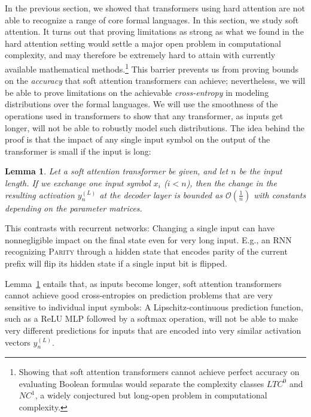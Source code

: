 \documentclass[11pt,a4paper]{article}
\newcounter{theorem}
\newtheorem{lemma}[theorem]{Lemma}
\begin{document}
In the previous section, we showed that transformers using hard attention are not able to recognize a range of core formal languages.
In this section, we study soft attention.
It turns out that proving limitations as strong as what we found in the hard attention setting would settle a major open problem in computational complexity, and  may therefore be extremely hard to attain with currently available mathematical methods.\footnote{Showing that soft attention transformers cannot achieve perfect accuracy on evaluating Boolean formulas would separate the complexity classes $LTC^0$ and $NC^1$, a widely conjectured but long-open problem in computational complexity.}
This barrier prevents us from proving bounds on the \emph{accuracy} that soft attention transformers can achieve; nevertheless, we will be able to prove limitations on the achievable \emph{cross-entropy} in modeling distributions over the formal languages.
We will use the smoothness of the operations used in transformers to show that any transformer, as inputs get longer, will not be able to robustly model such distributions.
The idea behind the proof is that the impact of any single input symbol on the output of the transformer is small if the input is long:
\begin{lemma}\label{lem:soft-tech}
Let a soft attention transformer be given, and let $n$ be the input length.
If we exchange one input symbol $x_i$ ($i < n$), %
then the change in the resulting activation $y_n^{(L)}$ at the decoder layer is bounded as $\mathcal{O}(\frac{1}{n})$ with constants depending on the parameter matrices. %
\end{lemma}
This contrasts with recurrent networks:
Changing a single input can have nonnegligible impact on the final state even for very long input.
E.g., an RNN recognizing \textsc{Parity} through a hidden state that encodes parity of the current prefix will flip its hidden state if a single input bit is flipped.


Lemma~\ref{lem:soft-tech} entails that, as inputs become longer, soft attention transformers cannot achieve good cross-entropies on prediction problems that are very sensitive to individual input symbols:
A Lipschitz-continuous prediction function, such as a ReLU MLP followed by a softmax operation, will not be able to make very different predictions for inputs that are encoded into very similar activation vectors $y_n^{(L)}$.
\end{document}
